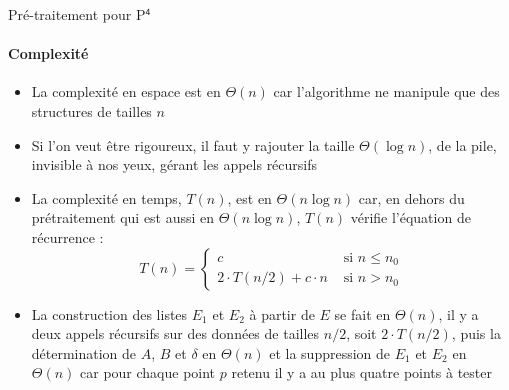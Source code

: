\documentclass[aspectratio=1610,francais,envcountsect]{beamer}
\begin{document}
\begin{frame}[allowframebreaks]{Pré-traitement pour P$^\mathsf{4}$
    \insertcontinuationtext}

  \framesubtitle{Complexité}

  \begin{itemize}
  \item La complexité en espace est en $\Theta(n)$ car l’algorithme ne
    manipule que des structures de tailles $n$
  \item Si l’on veut être rigoureux, il faut y rajouter la taille
    $\Theta(\log n)$, de la pile, invisible à nos yeux, gérant les
    appels récursifs
  \item La complexité en temps, $T(n)$, est en $\Theta(n\log n)$ car,
    en dehors du prétraitement qui est aussi en $\Theta(n\log n)$,
    $T(n)$ vérifie l’équation de récurrence :
    \begin{equation}
      \label{eq:p4cplx}
      T(n) =
      \begin{cases}
        c & \text{ si } n \leq n_0\\
        2\cdot T(n/2) + c\cdot n & \text{ si } n > n_0
      \end{cases}
    \end{equation}
 
  \item La construction des listes $E_1$ et $E_2$ à partir de $E$ se
    fait en $\Theta(n)$, il y a deux appels récursifs sur des données
    de tailles $n/2$, soit $2\cdot T(n/2)$, puis la détermination de
    $A$, $B$ et $\delta$ en $\Theta(n)$ et la suppression de $E_1$ et
    $E_2$ en $\Theta(n)$ car pour chaque point $p$ retenu il y a au
    plus quatre points à tester
  \end{itemize}
\end{frame}


\newcommand{\drawECBis}{%
  \node[point] (n1) at (0,0) {}; \node[point] (n2) at (2,-2) {};
  \node[point] (n3) at (5,-3) {}; \node[point] (n4) at (6,-0.5) {};
  \node[point] (n5) at (6,0.75) {}; \node[point] (n6) at (3.5,1.75)
  {}; \node[point] (n7) at (1,1.5) {}; \draw[thick] (n1) -- (n2) --
  (n3) -- (n4) -- (n5) -- (n6) -- (n7) -- (n1);

  \node[point] (n8) at (7.25,0.5) {}; \node[point] (n9) at (7.5,-0.75)
  {}; \node[point] (n10) at (9.5,-1.75) {}; \node[point] (n11) at
  (13,-1.25) {}; \node[point] (n12) at (14,0.5) {}; \node[point] (n13)
  at (13,2.5) {}; \node[point] (n14) at (9.5,3) {}; \node[point] (n15)
  at (8,2) {}; \draw[thick] (n8) -- (n9) -- (n10) -- (n11) -- (n12) --
  (n13) -- (n14) -- (n15) -- (n8); }
\end{document}
